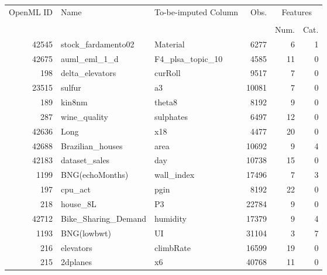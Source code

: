 \begin{table}[h!]
\centering
\begin{tabular}{rllrrr}
\toprule
\multirow{2}{*}{OpenML ID} & \multirow{2}{*}{Name} &\multirow{2}{*}{To-be-imputed Column} & \multirow{2}{*}{Obs.} & \multicolumn{2}{c}{Features} \\ \cline{5-6}
\\[-0.75em]
&                     &  &                            & Num.    & Cat.   \\
\midrule
     42545 &  stock\_fardamento02 &  Material &        6277 &                6 &                1 \\
     42675 &        auml\_eml\_1\_d &   F4\_plsa\_topic\_10 &      4585 &               11 &                0 \\
       198 &     delta\_elevators &   curRoll &      9517 &                7 &                0 \\
     23515 &              sulfur &     a3 &   10081 &                7 &                0 \\
       189 &              kin8nm &     theta8 &    8192 &                9 &                0 \\
       287 &        wine\_quality &    sulphates &     6497 &               12 &                0 \\
     42636 &                Long &     x18 &    4477 &               20 &                0 \\
     42688 &    Brazilian\_houses &   area &     10692 &                9 &                4 \\
     42183 &       dataset\_sales &   day &     10738 &               15 &                0 \\
      1199 &     BNG(echoMonths) &   wall\_index &     17496 &                7 &                3 \\
       197 &             cpu\_act &    pgin &     8192 &               22 &                0 \\
       218 &            house\_8L &    P3 &    22784 &                9 &                0 \\
     42712 & Bike\_Sharing\_Demand &   humidity &     17379 &                9 &                4 \\
      1193 &         BNG(lowbwt) &    UI &    31104 &                3 &                7 \\
       216 &           elevators &    climbRate &    16599 &               19 &                0 \\
       215 &            2dplanes &    x6 &    40768 &               11 &                0 \\

\end{tabular}
\end{table}
